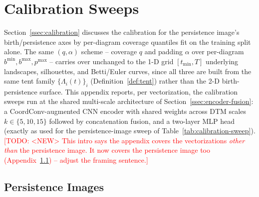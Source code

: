 \documentclass[11pt,letterpaper]{article}
\newcommand{\1}{\mathds{1}}
\newcommand{\todo}[1]{\textcolor{red}{[TODO: #1]}}
\newcommand{\fix}[1]{\textcolor{blue}{[FIX: #1]}}
\newcommand{\todo}[1]{}\newcommand{\fix}[1]{}
\theoremstyle{plain}
\theoremstyle{definitioncolon}
\begin{document}
\appendix

\section{Calibration Sweeps}
\label{app:calibration-sweeps}

\label{app:alt-calibration}%

Section~\ref{ssec:calibration} discusses the calibration for the persistence image's birth/persistence
axes by per-diagram coverage quantiles fit on the training split alone. The same
$(q, \alpha)$ scheme -- coverage $q$ and padding $\alpha$ over per-diagram
$b^{\min}, b^{\max}, p^{\max}$ -- carries over unchanged to the 1-D grid
$[t_{\min}, T]$ underlying landscapes, silhouettes, and Betti/Euler curves, since
all three are built from the same tent family $\{\Lambda_i(t)\}_i$
(Definition~\ref{def:tent}) rather than the 2-D birth-persistence surface. This
appendix reports, per vectorization, the calibration sweeps run at the shared
multi-scale architecture of Section~\ref{ssec:encoder-fusion}: a CoordConv-augmented
CNN encoder with shared weights across DTM scales $k \in \{5,10,15\}$ followed
by concatenation fusion, and a
two-layer MLP head (exactly as used for the persistence-image sweep of
Table~\ref{tab:calibration-sweep}).
\todo{<NEW> This intro says the appendix covers the vectorizations
\emph{other than} the persistence image. It now covers the persistence image
too (Appendix~\ref{app:calib-pi}) -- adjust the framing sentence.}

\subsection{Persistence Images}
\label{app:calib-pi}
\end{document}
